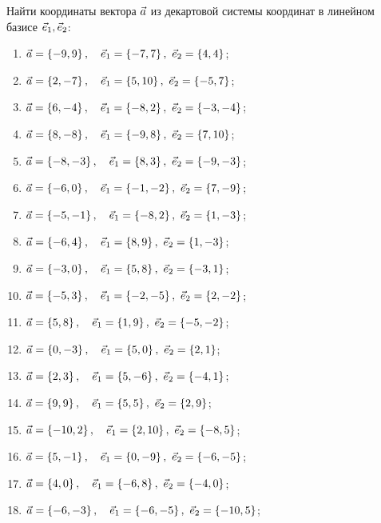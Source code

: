 	\vspace{15pt}
	Найти координаты вектора $\va$ из декартовой системы координат в линейном базисе $\ve_1, \ve_2$:

	\begin{enumerate}
		\setcounter{enumi}{\value{tasks}}

		\item \( \displaystyle \va = \bracs{-9, 9}, \quad \ve_1 = \bracs{-7, 7}, ~ \ve_2 = \bracs{4, 4} \);
		\item \( \displaystyle \va = \bracs{2, -7}, \quad \ve_1 = \bracs{5, 10}, ~ \ve_2 = \bracs{-5, 7} \);
		\item \( \displaystyle \va = \bracs{6, -4}, \quad \ve_1 = \bracs{-8, 2}, ~ \ve_2 = \bracs{-3, -4} \);
		\item \( \displaystyle \va = \bracs{8, -8}, \quad \ve_1 = \bracs{-9, 8}, ~ \ve_2 = \bracs{7, 10} \);
		\item \( \displaystyle \va = \bracs{-8, -3}, \quad \ve_1 = \bracs{8, 3}, ~ \ve_2 = \bracs{-9, -3} \);
		\item \( \displaystyle \va = \bracs{-6, 0}, \quad \ve_1 = \bracs{-1, -2}, ~ \ve_2 = \bracs{7, -9} \);
		\item \( \displaystyle \va = \bracs{-5, -1}, \quad \ve_1 = \bracs{-8, 2}, ~ \ve_2 = \bracs{1, -3} \);
		\item \( \displaystyle \va = \bracs{-6, 4}, \quad \ve_1 = \bracs{8, 9}, ~ \ve_2 = \bracs{1, -3} \);
		\item \( \displaystyle \va = \bracs{-3, 0}, \quad \ve_1 = \bracs{5, 8}, ~ \ve_2 = \bracs{-3, 1} \);
		\item \( \displaystyle \va = \bracs{-5, 3}, \quad \ve_1 = \bracs{-2, -5}, ~ \ve_2 = \bracs{2, -2} \);
		\item \( \displaystyle \va = \bracs{5, 8}, \quad \ve_1 = \bracs{1, 9}, ~ \ve_2 = \bracs{-5, -2} \);
		\item \( \displaystyle \va = \bracs{0, -3}, \quad \ve_1 = \bracs{5, 0}, ~ \ve_2 = \bracs{2, 1} \);
		\item \( \displaystyle \va = \bracs{2, 3}, \quad \ve_1 = \bracs{5, -6}, ~ \ve_2 = \bracs{-4, 1} \);
		\item \( \displaystyle \va = \bracs{9, 9}, \quad \ve_1 = \bracs{5, 5}, ~ \ve_2 = \bracs{2, 9} \);
		\item \( \displaystyle \va = \bracs{-10, 2}, \quad \ve_1 = \bracs{2, 10}, ~ \ve_2 = \bracs{-8, 5} \);
		\item \( \displaystyle \va = \bracs{5, -1}, \quad \ve_1 = \bracs{0, -9}, ~ \ve_2 = \bracs{-6, -5} \);
		\item \( \displaystyle \va = \bracs{4, 0}, \quad \ve_1 = \bracs{-6, 8}, ~ \ve_2 = \bracs{-4, 0} \);
		\item \( \displaystyle \va = \bracs{-6, -3}, \quad \ve_1 = \bracs{-6, -5}, ~ \ve_2 = \bracs{-10, 5} \);

		\setcounter{tasks}{\value{enumi}}
	\end{enumerate}

